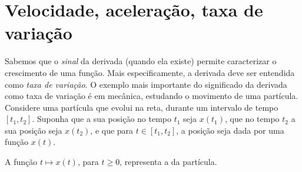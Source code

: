 \section{Velocidade, aceleração, taxa de
variação}\label{sec:taxavariacao}
Sabemos que o \emph{sinal} da derivada (quando ela existe)
permite caracterizar o {crescimento de uma função}.
Mais especificamente, a derivada deve ser entendida como
\emph{taxa de variação}.
O exemplo mais importante do significado da derivada como taxa
de variação é em
mecânica, estudando o movimento de uma partícula.\\

Considere uma partícula que evolui na reta, durante um intervalo de tempo
$[t_1,t_2]$. 
Suponha que a sua posição no tempo $t_1$ seja $x(t_1)$,
que no tempo $t_2$ a sua posição seja $x(t_2)$, e que para
$t\in [t_1,t_2]$, a posição seja dada por uma função $x(t)$.
\begin{center}
\begin{bmlimage}\end{bmlimage}
\end{center}
A função
$t\mapsto x(t)$, para $t\geq 0$, representa a  da partícula.

\begin{center}
\begin{bmlimage}\end{bmlimage}
\end{center}

